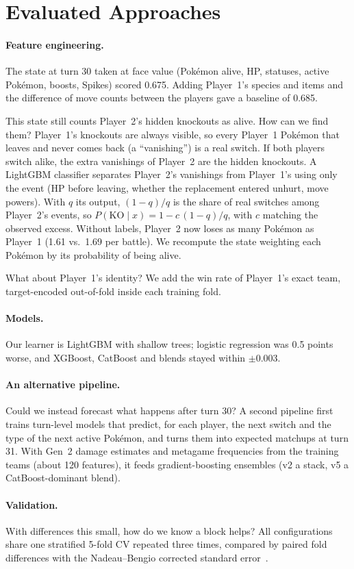 \section{Evaluated Approaches}
\label{sec:approaches}

\paragraph{Feature engineering.}
The state at turn 30 taken at face value (Pok\'emon alive, HP, statuses, active Pok\'emon,
boosts, Spikes) scored 0.675. Adding Player~1's species and items and
the difference of move counts between the players gave a baseline of 0.685.

This state still counts Player~2's hidden knockouts as alive. How can we find them? Player~1's
knockouts are always visible, so every Player~1 Pok\'emon that leaves and never comes back (a
``vanishing'') is a real switch. If both players switch alike, the extra vanishings of Player~2 are
the hidden knockouts. A LightGBM classifier separates Player~2's vanishings from Player~1's using
only the event (HP before leaving, whether the replacement entered unhurt, move powers). With $q$ its output, $(1-q)/q$ is the share of real switches among
Player~2's events, so $P(\mathrm{KO}\mid x)=1-c\,(1-q)/q$, with $c$ matching the observed excess. Without labels, Player~2 now loses as many
Pok\'emon as Player~1 (1.61 vs.\ 1.69 per battle). We recompute the state weighting each
Pok\'emon by its probability of being alive.

What about Player~1's identity? We add the win rate of Player~1's exact team, target-encoded
out-of-fold inside each training fold.

\paragraph{Models.}
Our learner is LightGBM with shallow trees; logistic regression was 0.5 points worse, and XGBoost,
CatBoost and blends stayed within $\pm0.003$.

\paragraph{An alternative pipeline.}
Could we instead forecast what happens after turn 30? A second pipeline first trains turn-level
models that predict, for each player, the next switch and the type of the next active Pok\'emon,
and turns them into expected matchups at turn 31. With Gen~2 damage estimates and metagame
frequencies from the training teams (about 120 features), it feeds gradient-boosting ensembles (v2 a stack, v5 a CatBoost-dominant blend).

\paragraph{Validation.}
With differences this small, how do we know a block helps? All configurations share one stratified
5-fold CV repeated three times, compared by paired fold differences with the Nadeau--Bengio
corrected standard error~\cite{nadeau2003}.
